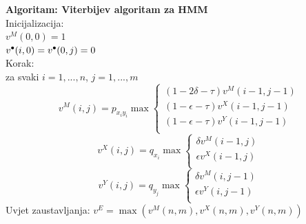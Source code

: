 \documentclass[a4paper]{article}
\newcommand\tab[1][1cm]{\hspace*{#1}}
\newcommand\sbullet[1][.5]{\mathbin{\vcenter{\hbox{\scalebox{#1}{$\bullet$}}}}}
\begin{document}
\textbf{Algoritam: Viterbijev algoritam za HMM} \cite{hmm_algorithms}\\
Inicijalizacija: \\
\tab \tab $v^M(0,0) = 1$\\
\tab \tab $v^{\sbullet[.75]}(i,0) = v^{\sbullet[.75]}(0,j) = 0$\\
Korak:\\
\tab za svaki $i=1,...,n$, $j=1,...,m$ \\
\begin{equation}
     v^M(i,j) = p_{x_iy_i} \max
    \begin{cases}
      (1 - 2\delta - \tau)v^M(i-1,j-1)\\
      (1-\epsilon-\tau)v^X(i-1,j-1)\\
      (1-\epsilon - \tau)v^Y(i-1,j-1)\\          
    \end{cases}
\end{equation}
\begin{equation}
     v^X(i,j) = q_{x_i}\max
    \begin{cases}
      \delta v^M(i-1,j)\\
      \epsilon v^X(i-1,j)\\
    \end{cases}   
\end{equation}
\begin{equation}
     v^Y(i,j) = q_{y_j}\max
    \begin{cases}
      \delta v^M(i,j-1)\\
      \epsilon v^Y(i,j-1)\\
    \end{cases}   
\end{equation}
Uvjet zaustavljanja:
$v^E = \max(v^M(n,m), v^X(n,m), v^Y(n,m))$ \\
\end{document}
